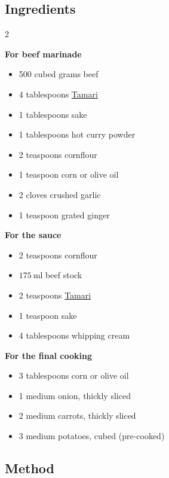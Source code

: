 \documentclass[11pt,a4paper]{article}
\begin{document}
\subsection*{Ingredients}

\begin{multicols}{2}

\textbf{For beef marinade}

\begin{itemize}
  \item 500 cubed grams beef
  \item 4 tablespoons \href{https://en.wikipedia.org/wiki/Tamari}{Tamari}
  \item 1 tablespoons sake
  \item 1 tablespoons hot curry powder
  \item 2 teaspoons cornflour
  \item 1 teaspoon corn or olive oil
  \item 2 cloves crushed garlic
  \item 1 teaspoon grated ginger
\end{itemize}

\columnbreak

\textbf{For the sauce}

\begin{itemize}
  \item 2 teaspoons cornflour
  \item $ \qty{175}{\ml} $ beef stock
  \item 2 teaspoons \href{https://en.wikipedia.org/wiki/Tamari}{Tamari}
  \item 1 teaspoon sake
  \item 4 tablespoons whipping cream
\end{itemize}

\textbf{For the final cooking}

\begin{itemize}
  \item 3 tablespoons corn or olive oil
  \item 1 medium onion, thickly sliced
  \item 2 medium carrots, thickly sliced
  \item 3 medium potatoes, cubed (pre-cooked)
\end{itemize}

\end{multicols}

\medskip

\subsection*{Method}
\end{document}
